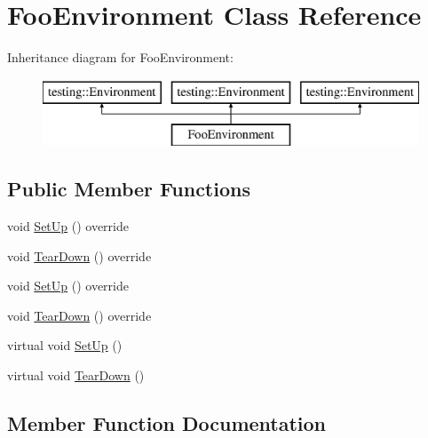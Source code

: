 \hypertarget{class_foo_environment}{}\section{Foo\+Environment Class Reference}
\label{class_foo_environment}
Inheritance diagram for Foo\+Environment\+:\begin{figure}[H]
\begin{center}
\leavevmode
\includegraphics[height=2.000000cm]{d3/de5/class_foo_environment}
\end{center}
\end{figure}
\subsection*{Public Member Functions}
\begin{DoxyCompactItemize}
\item 
void \mbox{\hyperlink{class_foo_environment_abf6a0edbb3be025e9f143a7a1b89f9dd}{Set\+Up}} () override
\item 
void \mbox{\hyperlink{class_foo_environment_a68511512cce59c5b848dc23b1300dc5a}{Tear\+Down}} () override
\item 
void \mbox{\hyperlink{class_foo_environment_abf6a0edbb3be025e9f143a7a1b89f9dd}{Set\+Up}} () override
\item 
void \mbox{\hyperlink{class_foo_environment_a68511512cce59c5b848dc23b1300dc5a}{Tear\+Down}} () override
\item 
virtual void \mbox{\hyperlink{class_foo_environment_a7db8d8b312805aff437ae8534132a56d}{Set\+Up}} ()
\item 
virtual void \mbox{\hyperlink{class_foo_environment_a99a2c9df52106cce9e7a4bdda53df802}{Tear\+Down}} ()
\end{DoxyCompactItemize}


\subsection{Member Function Documentation}
\mbox{\label{class_foo_environment_a7db8d8b312805aff437ae8534132a56d}} 
